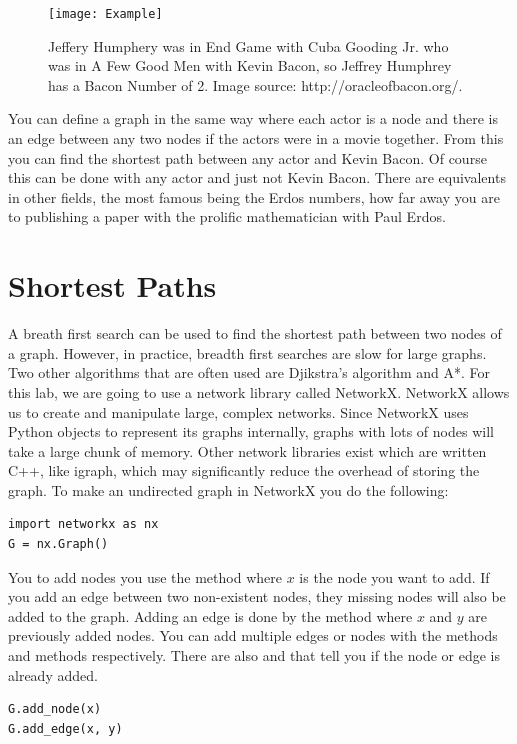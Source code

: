 \begin{figure}[h]
\texttt{[image: Example]}
\caption{Jeffery Humphery was in End Game with Cuba Gooding Jr. who was in A Few Good Men with Kevin Bacon, so Jeffrey Humphrey has a Bacon Number of 2.  Image source: http://oracleofbacon.org/.}
\end{figure}

You can define a graph in the same way where each actor is a node and there is an edge between any two nodes if the actors were in a movie together. From this you can find the shortest path between any actor and Kevin Bacon. Of course this can be done with any actor and just not Kevin Bacon. There are equivalents in other fields, the most famous being the Erdos numbers, how far away you are to publishing a paper with the prolific mathematician with Paul Erdos.

\section*{Shortest Paths}
A breath first search can be used to find the shortest path between two nodes of a graph.  However, in practice, breadth first searches are slow for large graphs. Two other algorithms that are often used are Djikstra's algorithm and A*. For this lab, we are going to use a network library called NetworkX. NetworkX allows us to create and manipulate large, complex networks.  Since NetworkX uses Python objects to represent its graphs internally, graphs with lots of nodes will take a large chunk of memory.  Other network libraries exist which are written C++, like igraph, which may significantly reduce the overhead of storing the graph.
To make an undirected graph in NetworkX you do the following:
\begin{lstlisting}
import networkx as nx
G = nx.Graph()
\end{lstlisting}
You to add nodes you use the  method where $x$ is the node you want to add.  If you add an edge between two non-existent nodes, they missing nodes will also be added to the graph. Adding an edge is done by the  method where $x$ and $y$ are previously added nodes. You can add multiple edges or nodes with the methods  and  methods respectively.  There are also  and  that tell you if the node or edge is already added.
\begin{lstlisting}
G.add_node(x)
G.add_edge(x, y)
\end{lstlisting}

